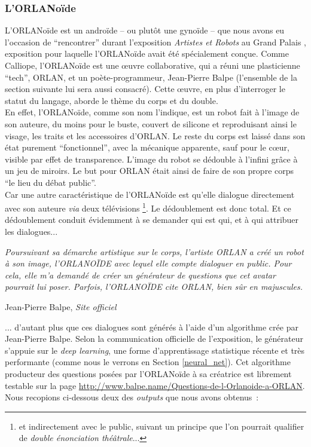 \documentclass{article}
\newenvironment{citationbox}
{\begin{center}
		\begin{minipage}{.8\textwidth}
		}
		{
		\end{minipage}	
\end{center}
}
\begin{document}
			\subsubsection{L'ORLANoïde}
				L'ORLANoïde est un androïde -- ou plutôt une gynoïde -- que nous avons eu l'occasion de ``rencontrer'' durant l'exposition \textit{Artistes et Robots} au Grand Palais \cite{artistes_robots}, exposition pour laquelle l'ORLANoïde avait été spécialement conçue. Comme Calliope, l'ORLANoïde est une œuvre collaborative, qui a réuni une plasticienne ``tech'', ORLAN, et un poète-programmeur, Jean-Pierre Balpe (l'ensemble de la section suivante lui sera aussi consacré). Cette œuvre, en plus d'interroger le statut du langage, aborde le thème du corps et du double.\\
				
				En effet, l'ORLANoïde, comme son nom l'indique, est un robot fait à l'image de son auteure, du moins pour le buste, couvert de silicone et reproduisant ainsi le visage, les traits et les accessoires d'ORLAN. Le reste du corps est laissé dans son état purement ``fonctionnel'', avec la mécanique apparente, sauf pour le cœur, visible par effet de transparence. L'image du robot se dédouble à l'infini grâce à un jeu de miroirs. Le but pour ORLAN était ainsi de faire de son propre corps ``le lieu du débat public''.\\
				Car une autre caractéristique de l'ORLANoïde est qu'elle dialogue directement avec son auteure \textit{via} deux télévisions \footnote{et indirectement avec le public, suivant un principe que l'on pourrait qualifier de \textit{double énonciation théâtrale}...}. Le dédoublement est donc total. Et ce dédoublement conduit évidemment à se demander qui est qui, et à qui attribuer les dialogues...
				\begin{citationbox}
					\textit{Poursuivant sa démarche artistique sur le corps, l’artiste ORLAN a créé un robot à son image, l’ORLANOÏDE avec lequel elle compte dialoguer en public. Pour cela, elle m’a demandé de créer un générateur de questions que cet avatar pourrait lui poser. Parfois, l’ORLANOÏDE cite ORLAN, bien sûr en majuscules.}\begin{flushleft}
						Jean-Pierre Balpe, \textit{Site officiel} \cite{balpe_site}
					\end{flushleft}
				\end{citationbox}
				... d'autant plus que ces dialogues sont générés à l'aide d'un algorithme crée par Jean-Pierre Balpe. Selon la communication officielle de l'exposition, le générateur s'appuie sur le \textit{deep learning}, une forme d'apprentissage statistique récente et très performante (comme nous le verrons en Section \ref{neural_net}). Cet algorithme producteur des questions posées par l'ORLANoïde à sa créatrice est librement testable sur la page \href{http://www.balpe.name/Questions-de-l-Orlanoide-a-ORLAN}{http://www.balpe.name/Questions-de-l-Orlanoide-a-ORLAN}. Nous recopions ci-dessous deux des \textit{outputs} que nous avons obtenus~:
\end{document}

